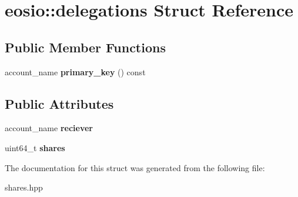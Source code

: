 \hypertarget{structeosio_1_1delegations}{}\section{eosio\+:\+:delegations Struct Reference}
\label{structeosio_1_1delegations}
\subsection*{Public Member Functions}
\begin{DoxyCompactItemize}
\item 
\mbox{\label{structeosio_1_1delegations_a0393cf193e9158107ec407721b15c899}} 
account\+\_\+name {\bfseries primary\+\_\+key} () const
\end{DoxyCompactItemize}
\subsection*{Public Attributes}
\begin{DoxyCompactItemize}
\item 
\mbox{\label{structeosio_1_1delegations_ad0dfb775c659089bc0cf6b0f3189b3c4}} 
account\+\_\+name {\bfseries reciever}
\item 
\mbox{\label{structeosio_1_1delegations_a396ac9ba7423d65ab552d7a03836ae61}} 
uint64\+\_\+t {\bfseries shares}
\end{DoxyCompactItemize}


The documentation for this struct was generated from the following file\+:\begin{DoxyCompactItemize}
\item 
shares.\+hpp\end{DoxyCompactItemize}

